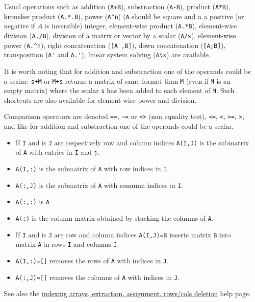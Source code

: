 
Usual operations such as addition (\verb-A+B-), substraction  (\verb+A-B+), product (\verb+A*B+), 
kroneker product (\verb+A.*.B+), power (\verb+A^n+) (\verb+A+ should be square and $n$ a positive (or negative if $A$
is inversible) integer, element-wise product (\verb+A.*B+), element-wise division (\verb+A./B+), 
division of a matrix or vector by a scalar  (\verb+A/s+), 
element-wise power (\verb+A.^n+), right concatenation  (\verb+[A ,B]+), 
down concatenation  (\verb+[A;B]+), transposition (\verb+A'+ and \verb+A.'+), 
linear system solving (\verb+A\x+) are available.

It is worth noting that for addition and substraction one of the operands could be a scalar:
\verb=s+M= or \verb=M+s= returns a matrix of same format than \verb+M+
(even if \verb+M+ is an empty matrix) where the scalar \verb=s= has been added to each
element of \verb+M+. Such shortcuts are also available for element-wise power and division. 

Comparizon operators are denoted \verb+==+, \verb+~=+ or  \verb+<>+ (non equality test), 
\verb+<=+, \verb+<+, \verb+>=+, \verb+>+, and like for  addition and substraction one of
the operands could be a scalar. 

\begin{itemize}
   \item If \verb+I+ and is \verb+J+ are respectively row and column indices \verb+A(I,J)+ is the submatrix of \verb+A+ with entries in \verb+I+ and \verb+j+.
   \item \verb+A(I,:)+ is the submatrix of \verb+A+ with row indices in \verb+I+.
   \item \verb+A(:,J)+ is the submatrix of \verb+A+ with comumn indices in \verb+I+.
   \item \verb+A(:,:)+ is \verb+A+
   \item \verb+A(:)+  is the column matrix obtained by stacking the columns of \verb+A+.
\end{itemize}
\begin{itemize}
   \item If \verb+I+ and is \verb+J+ are row and column indices \verb+A(I,J)=B+ inserts
matrix \verb+B+ into matrix \verb+A+ in rows \verb+I+ and columns \verb!J!.
   \item \verb+A(I,:)=[]+ removes the rows of \verb+A+ with indices in \verb+J+.
   \item \verb+A(:,J)=[]+ removes the columns of \verb+A+ with indices in \verb+J+.
\end{itemize}
See also the \hyperlink{indexing arrays}{indexing arrays, extraction, assignment, rows/cols deletion} help page.

